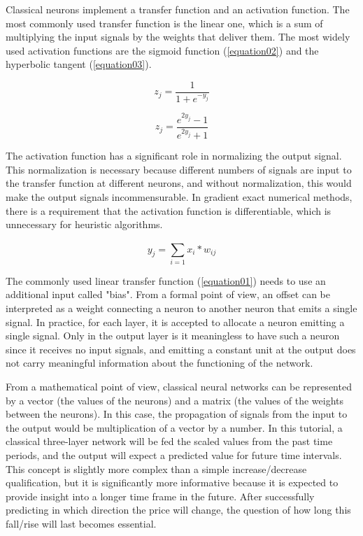 Classical neurons implement a transfer function and an activation function. The most commonly used transfer function is the linear one, which is a sum of multiplying the input signals by the weights that deliver them. The most widely used activation functions are the sigmoid function (\ref{equation02}) and the hyperbolic tangent (\ref{equation03}).

\begin{equation}
\label{equation02}
z_{j} = \frac{1}{1 + e^{-y_{j}}}
\end{equation}

\begin{equation}
\label{equation03}
z_{j} = \frac{e^{2y_{j}}-1}{e^{2y_{j}}+1}
\end{equation}

The activation function has a significant role in normalizing the output signal. This normalization is necessary because different numbers of signals are input to the transfer function at different neurons, and without normalization, this would make the output signals incommensurable. In gradient exact numerical methods, there is a requirement that the activation function is differentiable, which is unnecessary for heuristic algorithms.

\begin{equation}
\label{equation01}
y_{j} = \sum_{i=1}^{} x_{i}*w_{ij}
\end{equation}

The commonly used linear transfer function (\ref{equation01}) needs to use an additional input called "bias". From a formal point of view, an offset can be interpreted as a weight connecting a neuron to another neuron that emits a single signal. In practice, for each layer, it is accepted to allocate a neuron emitting a single signal. Only in the output layer is it meaningless to have such a neuron since it receives no input signals, and emitting a constant unit at the output does not carry meaningful information about the functioning of the network.

From a mathematical point of view, classical neural networks can be represented by a vector (the values of the neurons) and a matrix (the values of the weights between the neurons). In this case, the propagation of signals from the input to the output would be multiplication of a vector by a number. In this tutorial, a classical three-layer network will be fed the scaled values from the past time periods, and the output will expect a predicted value for future time intervals. This concept is slightly more complex than a simple increase/decrease qualification, but it is significantly more informative because it is expected to provide insight into a longer time frame in the future. After successfully predicting in which direction the price will change, the question of how long this fall/rise will last becomes essential.

